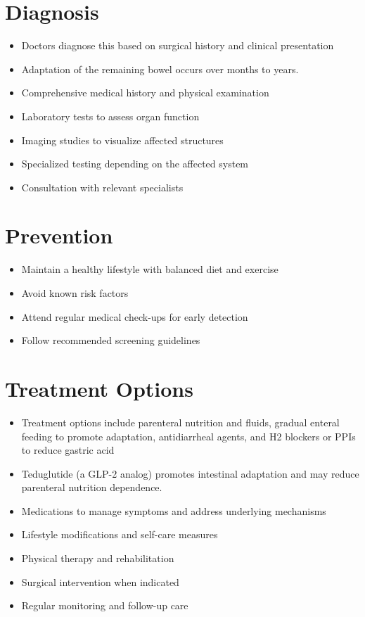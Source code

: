 \section{Diagnosis}
\begin{itemize}[noitemsep]
  \item Doctors diagnose this based on surgical history and clinical presentation
  \item Adaptation of the remaining bowel occurs over months to years.
  \item Comprehensive medical history and physical examination
  \item Laboratory tests to assess organ function
  \item Imaging studies to visualize affected structures
  \item Specialized testing depending on the affected system
  \item Consultation with relevant specialists
\end{itemize}
\section{Prevention}
\begin{itemize}[noitemsep]
  \item Maintain a healthy lifestyle with balanced diet and exercise
  \item Avoid known risk factors
  \item Attend regular medical check-ups for early detection
  \item Follow recommended screening guidelines
\end{itemize}
\section{Treatment Options}
\begin{itemize}[noitemsep]
  \item Treatment options include parenteral nutrition and fluids, gradual enteral feeding to promote adaptation, antidiarrheal agents, and H2 blockers or PPIs to reduce gastric acid
  \item Teduglutide (a GLP-2 analog) promotes intestinal adaptation and may reduce parenteral nutrition dependence.
  \item Medications to manage symptoms and address underlying mechanisms
  \item Lifestyle modifications and self-care measures
  \item Physical therapy and rehabilitation
  \item Surgical intervention when indicated
  \item Regular monitoring and follow-up care
\end{itemize}
